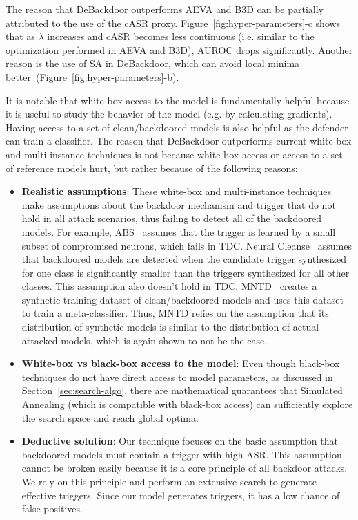 \documentclass[letterpaper,twocolumn,10pt]{article}
\begin{document}
The reason that DeBackdoor outperforms AEVA and B3D can be partially attributed to the use of the cASR proxy. Figure~\ref{fig:hyper-parameters}-c shows that as $\lambda$ increases and cASR becomes less continuous (i.e. similar to the optimization performed in AEVA and B3D), AUROC drops significantly. Another reason is the use of SA in DeBackdoor, which can avoid local minima better~(Figure~\ref{fig:hyper-parameters}-b).

It is notable that white-box access to the model is fundamentally helpful because it is useful to study the behavior of the model (e.g. by calculating gradients). Having access to a set of clean/backdoored models is also helpful as the defender can train a classifier. The reason that DeBackdoor outperforms current white-box and multi-instance techniques is not because white-box access or access to a set of reference models hurt, but rather because of the following reasons:
\begin{itemize}
\item \textbf{Realistic assumptions}: These white-box and multi-instance techniques make assumptions about the backdoor mechanism and trigger that do not hold in all attack scenarios, thus failing to detect all of the backdoored models. For example, ABS~\cite{liu2019abs} assumes that the trigger is learned by a small subset of compromised neurons, which fails in TDC. Neural Cleanse~\cite{wang2019cleanse} assumes that backdoored models are detected when the candidate trigger synthesized for one class is significantly smaller than the triggers synthesized for all other classes. This assumption also doesn't hold in TDC. MNTD~\cite{xu2021mntd} creates a synthetic training dataset of clean/backdoored models and uses this dataset to train a meta-classifier. Thus, MNTD relies on the assumption that its distribution of synthetic models is similar to the distribution of actual attacked models, which is again shown to not be the case. 

\item \textbf{White-box vs black-box access to the model}: Even though black-box techniques do not have direct access to model parameters, as discussed in Section~\ref{sec:search-algo}, there are mathematical guarantees that Simulated Annealing (which is compatible with black-box access) can sufficiently explore the search space and reach global optima.

\item \textbf{Deductive solution}: Our technique focuses on the basic assumption that backdoored models must contain a trigger with high ASR. This assumption cannot be broken easily because it is a core principle of all backdoor attacks. We rely on this principle and perform an extensive search to generate effective triggers. Since our model generates triggers, it has a low chance of false positives.
\end{itemize}
\end{document}
